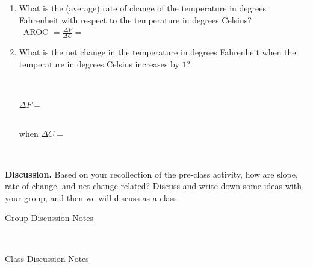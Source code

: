 \documentclass[10pt]{article}
\begin{document}
\begin{enumerate}
\begin{enumerate}
            \,\hfill
            {\Large $m=$ }
            \hfill\,\\
            
        \item[ii.] What is the (average) rate of change of the temperature in degrees Fahrenheit with respect to the temperature in degrees Celsius?\\
            
            \,\hfill
            {\Large AROC $=\frac{\Delta F}{\Delta C}=$ }
            \hfill\,\\

        \item[iii.] What is the net change in the temperature in degrees Fahrenheit when the temperature in degrees Celsius increases by $1$?

            \,\hfill
            {\Large $\Delta F=$\rule[-8pt]{0.5in}{0.4pt} when $\Delta C=$ }
            \hfill\,\\
            
        \end{enumerate}
    \end{enumerate}

\newpage
{\bf\color{blue}Discussion.} Based on your recollection of the pre-class activity, how are slope, rate of change, and net change related? Discuss and write down some ideas with your group, and then we will discuss as a class.\\ 

    \begin{minipage}[t][1.75in]{0.48\textwidth}
    \underline{Group Discussion Notes}
    \end{minipage}
    \,\vline \,
    \begin{minipage}[t][1.75in]{0.48\textwidth}
    \underline{Class Discussion Notes}
    \end{minipage}
    \hfill
\end{document}
